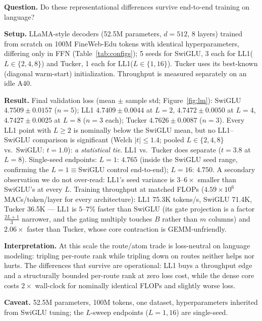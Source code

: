 \documentclass[11pt]{article}
\begin{document}
\textbf{Question.} Do these representational differences survive end-to-end training
on language?

\textbf{Setup.} LLaMA-style decoders (52.5M parameters, $d{=}512$, 8 layers) trained
from scratch on 100M FineWeb-Edu tokens with identical hyperparameters, differing
only in FFN (Table~\ref{tab:configs}); 5 seeds for SwiGLU, 3 each for
LL1($L\in\{2,4,8\}$) and Tucker, 1 each for LL1($L\in\{1,16\}$). Tucker uses its
best-known (diagonal warm-start) initialization. Throughput is measured separately on
an idle A40.

\textbf{Result.} Final validation loss (mean $\pm$ sample std; Figure~\ref{fig:lm}):
SwiGLU $4.7509 \pm 0.0157$ ($n{=}5$); LL1 $4.7409 \pm 0.0044$ at $L{=}2$,
$4.7472 \pm 0.0050$ at $L{=}4$, $4.7427 \pm 0.0025$ at $L{=}8$ ($n{=}3$ each);
Tucker $4.7626 \pm 0.0087$ ($n{=}3$). Every LL1 point with $L \ge 2$ is nominally
below the SwiGLU mean, but no LL1--SwiGLU comparison is significant (Welch
$|t| \le 1.4$; pooled $L\in\{2,4,8\}$ vs.\ SwiGLU: $t = 1.0$): \emph{a statistical
tie}. LL1 vs.\ Tucker does separate ($t = 3.8$ at $L{=}8$). Single-seed
endpoints: $L{=}1$: $4.765$ (inside the SwiGLU seed range, confirming the
$L{=}1\equiv$SwiGLU control end-to-end); $L{=}16$: $4.750$. A secondary observation
we do not over-read: LL1's seed variance is $3$--$6\times$ smaller than SwiGLU's at
every $L$. Training throughput at matched FLOPs
($4.59{\times}10^6$ MACs/token/layer for every architecture): LL1 75.3K tokens/s,
SwiGLU 71.4K, Tucker 36.5K --- LL1 is $5$--$7\%$ faster than SwiGLU (its gate
projection is a factor $\tfrac{2L+1}{3}$ narrower, and the gating multiply touches
$B$ rather than $m$ columns) and $2.06\times$ faster than Tucker, whose core
contraction is GEMM-unfriendly.

\textbf{Interpretation.} At this scale the route/atom trade is loss-neutral on
language modeling: tripling per-route rank while tripling down on routes neither
helps nor hurts. The differences that survive are operational: LL1 buys a throughput
edge and a structurally bounded per-route rank at zero loss cost, while the dense
core costs $2\times$ wall-clock for nominally identical FLOPs and slightly worse
loss.

\textbf{Caveat.} 52.5M parameters, 100M tokens, one dataset, hyperparameters
inherited from SwiGLU tuning; the $L$-sweep endpoints ($L{=}1, 16$) are single-seed.
\end{document}
